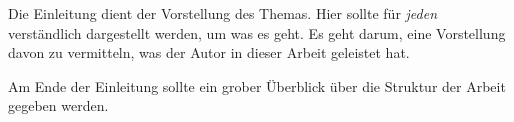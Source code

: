 
Die Einleitung dient der Vorstellung des Themas. Hier sollte für \emph{jeden} verständlich dargestellt werden, um was es geht. Es geht darum, eine Vorstellung davon zu vermitteln, was der Autor in dieser Arbeit geleistet hat.

Am Ende der Einleitung sollte ein grober Überblick über die Struktur der Arbeit gegeben werden.

